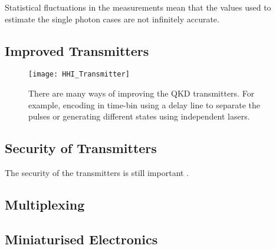 Statistical fluctuations in the measurements mean that the values used to estimate the single photon cases are not infinitely accurate. 

\subsection{Improved Transmitters}

\begin{figure}[tbp]
	\texttt{[image: HHI\_Transmitter]}
	\caption[Latest generation InP Transmitter Device]{There are many ways of improving the QKD transmitters. For example, encoding in time-bin using a delay line to separate the pulses or generating different states using independent lasers.}
\end{figure}

\subsection{Security of Transmitters}

The security of the transmitters is still important \cite{makarov2019}.

\subsection{Multiplexing}

\subsection{Miniaturised Electronics}


